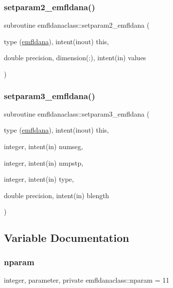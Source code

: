 \subsubsection{\texorpdfstring{setparam2\_emfldana()}{setparam2\_emfldana()}}
{\footnotesize\ttfamily subroutine emfldanaclass\+::setparam2\+\_\+emfldana (\begin{DoxyParamCaption}\item[{type (\mbox{\hyperlink{namespaceemfldanaclass_structemfldanaclass_1_1emfldana}{emfldana}}), intent(inout)}]{this,  }\item[{double precision, dimension(\+:), intent(in)}]{values }\end{DoxyParamCaption})}

\mbox{\label{namespaceemfldanaclass_aad90f0dd7002f12e7a5ba004dfb37635}} 
\subsubsection{\texorpdfstring{setparam3\_emfldana()}{setparam3\_emfldana()}}
{\footnotesize\ttfamily subroutine emfldanaclass\+::setparam3\+\_\+emfldana (\begin{DoxyParamCaption}\item[{type (\mbox{\hyperlink{namespaceemfldanaclass_structemfldanaclass_1_1emfldana}{emfldana}}), intent(inout)}]{this,  }\item[{integer, intent(in)}]{numseg,  }\item[{integer, intent(in)}]{nmpstp,  }\item[{integer, intent(in)}]{type,  }\item[{double precision, intent(in)}]{blength }\end{DoxyParamCaption})}



\subsection{Variable Documentation}
\mbox{\label{namespaceemfldanaclass_a3ce28adb644b4d35b7f3e9713a275828}} 
\subsubsection{\texorpdfstring{nparam}{nparam}}
{\footnotesize\ttfamily integer, parameter, private emfldanaclass\+::nparam = 11\hspace{0.3cm}{\ttfamily [private]}}

